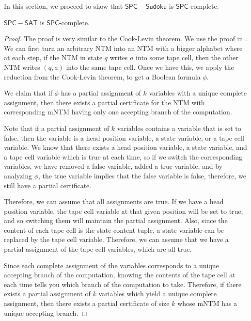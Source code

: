 \documentclass[runningheads,a4paper]{llncs}
\begin{document}
In this section, we proceed to show that $\mathsf{SPC-Sudoku}$ is $\mathsf{SPC}$-complete.

\begin{theorem}
$\mathsf{SPC-SAT}$ is $\mathsf{SPC}$-complete.
\end{theorem}

\begin{proof}
The proof is very similar to the Cook-Levin theorem. We use the proof in \cite{Garey}. We can first turn an arbitrary NTM into an NTM with a bigger alphabet where at each step, if the NTM in state $q$ writes $a$ into some tape cell, then the other NTM writes $(q,a)$ into the same tape cell. Once we have this, we apply the reduction from the Cook-Levin theorem, to get a Boolean formula $\phi$. 

We claim that if $\phi$ has a partial assignment of $k$ variables with a unique complete assignment, then there exists a partial certificate for the NTM with corresponding mNTM having only one accepting branch of the computation.

Note that if a partial assignment of $k$ variables contains a variable that is set to false, then the variable is a head position variable, a state variable, or a tape cell variable. We know that there exists a head position variable, a state variable, and a tape cell variable which is true at each time, so if we switch the corresponding variables, we have removed a false variable, added a true variable, and by analyzing $\phi$, the true variable implies that the false variable is false, therefore, we still have a partial certificate. 

Therefore, we can assume that all assignments are true. If we have a head position variable, the tape cell variable at that given position will be set to true, and so switching them will maintain the partial assignment. Also, since the content of each tape cell is the state-content tuple, a state variable can be replaced by the tape cell variable. Therefore, we can assume that we have a partial assignment of the tape-cell variables, which are all true. 

Since each complete assignment of the variables corresponds to a unique accepting branch of the computation, knowing the contents of the tape cell at each time tells you which branch of the computation to take. Therefore, if there exists a partial assignment of $k$ variables which yield a unique complete assignment, then there exists a partial certificate of size $k$ whose mNTM has a unique accepting branch.
\end{proof}
\end{document}
